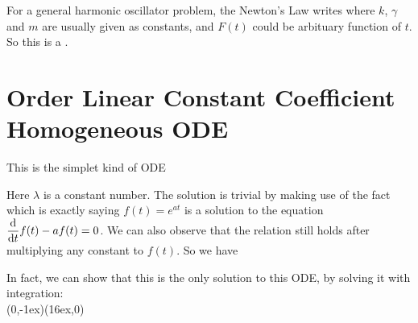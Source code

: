 \documentclass[class=article, crop=false, 12pt]{standalone}
\begin{document}
\begin{notation}[]
    For a general harmonic oscillator problem, the Newton's  Law writes 
    where $k$, $\gamma$ and $m$ are usually given as constants, 
    and $F(t)$ could be arbituary function of $t$. 
    So this is a .

\end{notation}


\linesep
\section{ Order Linear Constant Coefficient Homogeneous ODE}

This is the simplet kind of ODE

Here $\lambda$ is a constant number. 
The solution is trivial by making use of the fact 
which is exactly saying $f(t)=e^{at}$ is a solution to the equation
$\dvv{t}f(t) - af(t) = 0$.
We can also observe that the relation still holds after 
multiplying any constant to $f(t)$. So we have
\\

In fact, we can show that this is the only solution to this ODE, by solving it with integration:
\\
{(0,-1ex)}{(16ex,0)}
\end{document}
